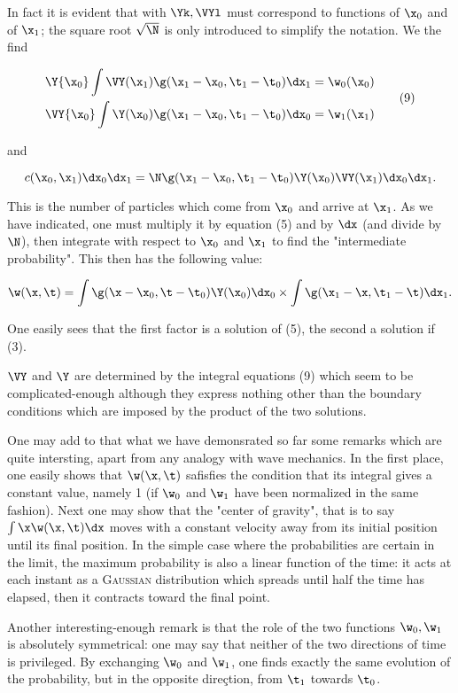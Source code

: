 \documentclass{article}
\newcommand{\nequ}[2]{
\begin{equation*}
#1
\tag{#2}
\end{equation*}
}
\newcommand{\uequ}[1]{
\begin{equation*}
#1
\end{equation*}
}
\newcommand{\var}[1]{#1}
\renewcommand{\sc}[1]{\textsc{#1}}
\begin{document}
In fact it is evident that with $\Yk, \VYl$ must correspond to functions of $\x_0$ and of $\x_1$; the square root $\sqrt{\N}$ is only introduced to simplify the notation. We the find
\nequ{
\begin{split}
&\Y{\x_0} \int\VY(\x_1)\g(\x_1 - \x_0, \t_1 - \t_0)\dx_1 = \w_0(\x_0) \\
&\VY{\x_0} \int\Y(\x_0)\g(\x_1 - \x_0, \t_1 - \t_0)\dx_0 = \w_1(\x_1) \\
\end{split}
}{9}
and
\uequ{
\var{c}(\x_0, \x_1)\dx_0\dx_1 = \N\g(\x_1-\x_0, \t_1-\t_0)\Y(\x_0)\VY(\x_1)\dx_0\dx_1.
}

This is the number of particles which come from $\x_0$ and arrive at $\x_1$. As we have indicated, one must multiply it by equation (5) and by $\dx$ (and divide by $\N$), then integrate with respect to $\x_0$ and $\x_1$ to find the "intermediate probability". This then has the following value:
\uequ{
\w(\x, \t) = \int\g(\x - \x_0, \t - \t_0)\Y(\x_0)\dx_0\times\int\g(\x_1 - \x, \t_1 - \t)\dx_1.
}

One easily sees that the first factor is a solution of (5), the second a solution if (3).

$\VY$ and $\Y$ are determined by the integral equations (9) which seem to be complicated-enough although they express nothing other than the boundary conditions which are imposed by the product of the two solutions.

One may add to that what we have demonsrated so far some remarks which are quite intersting, apart from any analogy with wave mechanics. In the first place, one easily shows that $\w(\x,\t)$ safisfies the condition that its integral gives a constant value, namely 1 (if $\w_0$ and $\w_1$ have been normalized in the same fashion). Next one may show that the "center of gravity", that is to say $\int\x\w(\x,\t)\dx$ moves with a constant velocity away from its initial position until its final position. In the simple case where the probabilities are certain in the limit, the maximum probability is also a linear function of the time: it acts at each instant as a \sc{Gaussian} distribution which spreads until half the time has elapsed, then it contracts toward the final point.

Another interesting-enough remark is that the role of the two functions $\w_0, \w_1$ is absolutely symmetrical: one may say that neither of the two directions of time is privileged. By exchanging $\w_0$ and $\w_1$, one finds exactly the same evolution of the probability, but in the opposite direçtion, from $\t_1$ towards $\t_0$.
\end{document}
